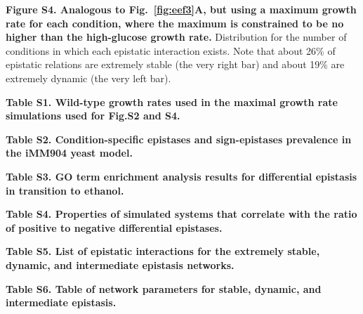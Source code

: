 \documentclass[10pt]{article}
\newcommand{\Fig}{Fig.}
\newcommand{\Figs}{Fig.} %
\begin{document}
\begin{description}
\item {\bf Figure S4. Analogous to \Fig~\ref{fig:eef3}A, but using a
maximum growth rate for each condition, where the maximum is
constrained to be no higher than the high-glucose growth rate.}
Distribution for the number of conditions in which each epistatic
interaction exists. Note that about 26\% of epistatic relations are
extremely stable (the very right bar) and about 19\% are extremely
dynamic (the very left bar). 

\item {\bf Table S1. Wild-type growth rates used in the maximal growth
rate simulations used for \Figs S2 and S4.}

\item {\bf Table S2. Condition-specific epistases and sign-epistases
prevalence in the iMM904 yeast model.}

\item {\bf Table S3. GO term enrichment analysis results for
differential epistasis in transition to ethanol.}

\item {\bf Table S4. Properties of simulated systems that correlate
with the ratio of positive to negative differential epistases.}

\item {\bf Table S5. List of epistatic interactions for the extremely
stable, dynamic, and intermediate epistasis networks.}

\item {\bf Table S6. Table of network parameters for stable, dynamic,
and intermediate epistasis.}


\end{description}
\end{document}
